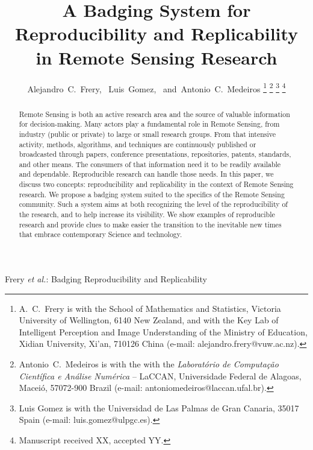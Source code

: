\documentclass[journal,twoside]{IEEEtran}
\begin{document}
	
\title{A Badging System for Reproducibility and Replicability in Remote Sensing Research}
	
\author{Alejandro~C.~Frery,~
	Luis~Gomez,~
	and~Antonio~C.~Medeiros%
	\thanks{A.\ C.\ Frery is with the School of Mathematics and Statistics, Victoria University of Wellington, 6140 New Zealand, and with the Key Lab of Intelligent Perception and Image Understanding of the Ministry of Education, Xidian University, Xi'an, 710126 China (e-mail: alejandro.frery@vuw.ac.nz).}%
	\thanks{Antonio~C.~Medeiros is with the with the \textit{Laborat\'orio de Computa\c c\~ao Cient\'ifica e An\'alise Num\'erica} -- LaCCAN, Universidade Federal de Alagoas, Macei\'o, 57072-900 Brazil (e-mail: antoniomedeiros@laccan.ufal.br).}%
	\thanks{Luis Gomez is with the Universidad de Las Palmas de Gran Canaria, 35017 Spain (e-mail: luis.gomez@ulpgc.es).}%
	\thanks{Manuscript received XX, accepted YY.}}

%
{Frery \MakeLowercase{\textit{et al.}}: Badging Reproducibility and Replicability}

\maketitle
\begin{abstract}
	Remote Sensing is both an active research area and the source of valuable information for decision-making.
	Many actors play a fundamental role in Remote Sensing, from industry (public or private) to large or small research groups. 
	From that intensive activity, methods, algorithms, and techniques are continuously published or broadcasted through papers, conference presentations, repositories, patents, standards, and other means.     
	The consumers of that information need it to be readily available and dependable. 
	Reproducible research can handle those needs.
	In this paper, we discuss two concepts: reproducibility and replicability in the context of Remote Sensing research. 
	We propose a badging system suited to the specifics of the Remote Sensing community.
	Such a system aims at both recognizing the level of the reproducibility of the research, and to help increase its visibility. 
	We show examples of reproducible research and provide clues to make easier the transition to the inevitable new times that embrace contemporary Science and technology. 
\end{abstract}
\end{document}

